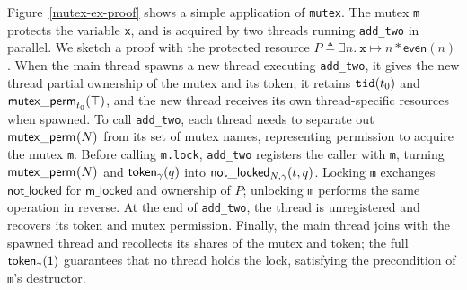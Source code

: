 Figure~\ref{mutex-ex-proof} shows a simple application of \lstinline{mutex}. The mutex \lstinline{m} protects the variable \lstinline{x}, and is acquired by two threads running \lstinline{add_two} in parallel. We sketch a proof with the protected resource $P \triangleq \exists n.\ \texttt{x} \mapsto n \ast \mathsf{even}(n)$%
. When the main thread spawns a new thread executing \lstinline{add_two}, it gives the new thread partial ownership of the mutex and its token; it retains $\currentthread{t_0}$ and $\mutexperm{t_0}{\top}$, and the new thread receives its own thread-specific resources when spawned. To call \lstinline{add_two}, each thread needs to separate out $\mutexperm{}{N}$ from its set of mutex names, representing permission to acquire the mutex \lstinline{m}. Before calling \lstinline{m.lock}, \lstinline{add_two} registers the caller with \lstinline{m}, turning $\mutexperm{}{\mutexname{N}}$ and $\token{\gamma}{q}$ into $\notlocked{N, \gamma}{t}{q}$. Locking \lstinline{m} exchanges $\mathsf{not\_locked}$ for $\mathsf{m\_locked}$ and ownership of $P$; unlocking \lstinline{m} performs the same operation in reverse. At the end of \lstinline{add_two}, the thread is unregistered and recovers its token and mutex permission.
Finally, the main thread joins with the spawned thread and recollects its shares of the mutex and token; the full $\token{\gamma}{1}$ guarantees that no thread holds the lock, satisfying the precondition of \lstinline{m}'s destructor.

